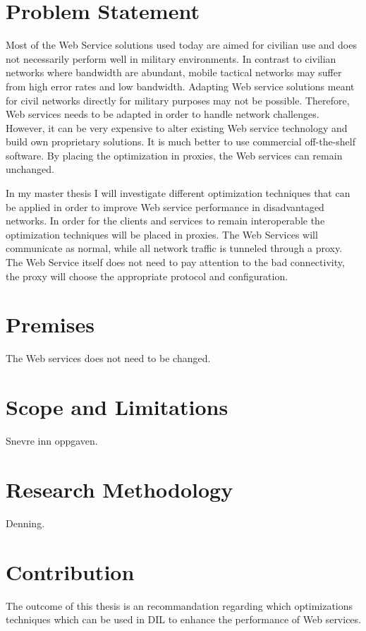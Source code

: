 \documentclass[USenglish]{article}
\begin{document}
\section{Problem Statement}
Most of the Web Service solutions used today are aimed for civilian use and does not necessarily perform well in military environments. In contrast to civilian networks where bandwidth are abundant, mobile tactical networks may suffer from high error rates and low bandwidth. Adapting Web service solutions meant for civil networks directly for military purposes may not be possible. Therefore, Web services needs to be adapted in order to handle network challenges. However, it can be very expensive to alter existing Web service technology and build own proprietary solutions. It is much better to use commercial off-the-shelf software. By placing the optimization in proxies, the Web services can remain unchanged.

In my master thesis I will investigate different optimization techniques that can be applied in order to improve Web service performance in disadvantaged networks. In order for the clients and services to remain interoperable the optimization techniques will be placed in proxies. The Web Services will communicate as normal, while all network traffic is tunneled through a proxy. The Web Service itself does not need to pay attention to the bad connectivity, the proxy will choose the appropriate protocol and configuration.

\section{Premises}
The Web services does not need to be changed. 

\section{Scope and Limitations}
Snevre inn oppgaven.

\section{Research Methodology}
Denning.

\section{Contribution}
The outcome of this thesis is an recommandation regarding which optimizations techniques which can be used in DIL to enhance the performance of Web services.
\end{document}
